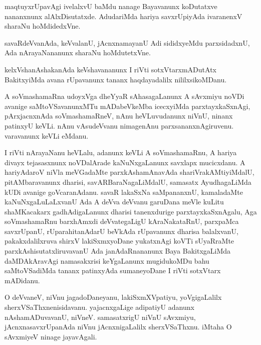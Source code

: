 \documentclass{article}
\begin{document}
\begin{mn}
maqtuyxrUpavAgi ivelalxvU  baMdu nanage Bayavanunx koDutatxve  nananxnunx 
alAlxDisutatxde.  AdudariMda  hariya  savxrUpiyAda  ivaranenxV sharaNu hoMdidedxVne.
\end{mn}

\begin{mn}
savaRdeVvanAda,  keVvalanU,  jAcnxnamayanU Adi sididxyeMdu parxsidadxnU, 
Ada nArayaNananunx sharaNu hoMdutetxVne.
\end{mn}

\begin{mn}
kelxVshanAshakanAda keVshavananunx I riVti  sotxVtarxmADutAtx  BakitxyiMda 
avana rUpavanunx tananx haqdayadalilx nililxsikoMDanu.
\end{mn}

\begin{mn}
A soVmashamaRna udoyxVga dheYyaR sAhasagaLanunx  A sAvxmiyu  noVDi avanige 
saMtoVSavanunxMTu mADabeVkeMba  icecxyiMda parxtayxkaSxnAgi, pArxjacnxnAda 
soVmashamaRneV, nAnu heVLuvudanunx niVnU, ninanx patinxyU keVLi.  nAnu 
vAsudeVvanu  nimagenAnu  parxsananxnAgiruvenu.  varavanunx keVLi eMdanu.
\end{mn}

\begin{mn}
I riVti nArayaNanu heVLalu, adanunx keVLi A soVmashamaRnu, A hariya divayx 
tejasasxnunx noVDalArade kaNuNxgaLanunx savxlapx mucicxdanu. A hariyAdaroV 
niVla meVGadaMte parxkAshamAnavAda shariVrakAMtiyiMdalU, pitAMbaravanunx dharisi, 
savARBaraNagaLiMdalU, samasatx  AyudhagaLiMda kUDi avanige goVcaranAdanu.  
savaR lakaSxNa saMpananxnU, kamaladaMte kaNuNxgaLuLaLxvanU Ada A deVva deVvanu  
garuDana  meVle kuLitu shaMKacakarx gadhAdigaLanunx  dharisi  tanenxdurige 
parxtayxkaSxnAgalu, Aga soVmashamaRnu barxhAmxdi deVvategaLigU  kAraNakataRnU, 
parxpaMca savxrUpanU, rUparahitanAdarU beVkAda rUpavanunx dharisa balalxvanU, 
pakakxdalilxruva  shirxV lakiSxmxyoDane yukatxnAgi koVTi sUyaRraMte 
parxkAshisutatxliruvavanU Ada  janAdaRnananunx Baya BakitxgaLiMda  daMDAkAravAgi  
namasakxrisi keYgaLanunx mugidukoMDu bahu saMtoVSadiMda tananx patinxyAda 
sumaneyoDane I riVti sotxVtarx mADidanu.
\end{mn}

\begin{mn}
O deVvaneV, niVnu  jagadoDaneyanu,  lakiSxmXVpatiyu, yoVgigaLalilx sherxVSaThxnenisidavanu.  
yajacnxgaLige adipatiyU adanunx nAshamADuvavanU, niVneV.  samasatxrigU  niVnU sAvxmiyu,  
jAcnxnasavxrUpanAda  niVnu jAcnxnigaLalilx sherxVSaThxnu.  iMtaha O sAvxmiyeV ninage  jayavAgali.
\end{mn}
\end{document}
